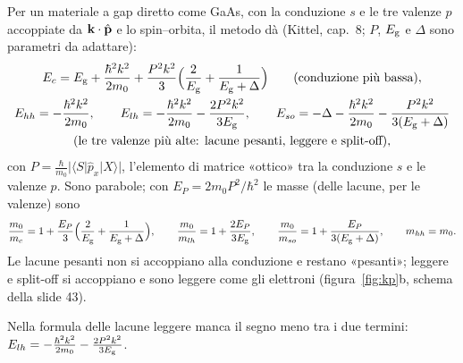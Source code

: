 \documentclass[11pt,a4paper]{article}
\begin{document}
Per un materiale a gap diretto come GaAs, con la conduzione $s$ e le tre valenze $p$ accoppiate da $\mathbf k\cdot\hat{\mathbf p}$ e lo spin--orbita, il metodo dà
(Kittel, cap.~8; $P$, $E_{\mathrm g}$ e $\Delta$ sono parametri da adattare):
\begin{gather*}
E_c=E_{\mathrm g}+\frac{\hbar^2k^2}{2m_0}+\frac{P^2k^2}3\Bigl(\frac2{E_{\mathrm g}}+\frac1{E_{\mathrm g}+\Delta}\Bigr)\qquad(\text{conduzione più bassa}),\\
E_{hh}=-\frac{\hbar^2k^2}{2m_0},\qquad
E_{lh}=-\frac{\hbar^2k^2}{2m_0}-\frac{2P^2k^2}{3E_{\mathrm g}},\qquad
E_{so}=-\Delta-\frac{\hbar^2k^2}{2m_0}-\frac{P^2k^2}{3(E_{\mathrm g}+\Delta)}\\
(\text{le tre valenze più alte: lacune pesanti, leggere e split-off}),
\end{gather*}
con $P=\frac\hbar{m_0}|\langle S|\hat p_x|X\rangle|$, l'elemento di matrice «ottico» tra la conduzione $s$ e le valenze $p$. Sono parabole; con
$E_P=2m_0P^2/\hbar^2$ le masse (delle lacune, per le valenze) sono
\[
\frac{m_0}{m_c}=1+\frac{E_P}3\Bigl(\frac2{E_{\mathrm g}}+\frac1{E_{\mathrm g}+\Delta}\Bigr),\qquad
\frac{m_0}{m_{lh}}=1+\frac{2E_P}{3E_{\mathrm g}},\qquad
\frac{m_0}{m_{so}}=1+\frac{E_P}{3(E_{\mathrm g}+\Delta)},\qquad m_{hh}=m_0 .
\]
Le lacune pesanti non si accoppiano alla conduzione e restano «pesanti»; leggere e split-off si accoppiano e sono leggere come gli elettroni
(figura~\ref{fig:kp}b, schema della slide 43).

\begin{osservazione}
Nella formula delle lacune leggere manca il segno meno tra i due termini: $E_{lh}=-\frac{\hbar^2k^2}{2m_0}-\frac{2P^2k^2}{3E_{\mathrm g}}$.
\end{osservazione}
\end{document}

